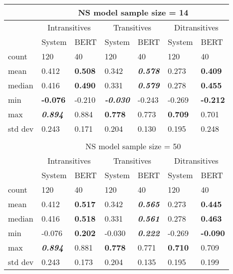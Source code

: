 \begin{table}[htb!]
\begin{center}
\begin{tabular}{|l||l|l||l|l||l|l|}
\hline
 & \multicolumn{6}{c|}{NS model sample size = 14} \\
\hline
 & \multicolumn{2}{c||}{Intransitives} & \multicolumn{2}{c||}{Transitives} & \multicolumn{2}{c|}{Ditransitives} \\
\hline
		& System 	& BERT 		& System 	& BERT 		& System 	& BERT 		\\
\hline
\hline
count 	& 120 		& 40 		& 120 		& 40 		& 120 		& 40		 \\
\hline
mean 	& 0.412 	& \textbf{0.508} 	& 0.342 	& \textit{\textbf{0.578}}		& 0.273 	& \textbf{0.409}	 \\
\hline
median 	& 0.416 	& \textbf{0.490} 	& 0.331 	& \textit{\textbf{0.579}}		& 0.278 	& \textbf{0.455}	 \\
\hline
min 	& \textbf{-0.076} 	& -0.210 	& \textit{\textbf{-0.030}} 	& -0.243	& -0.269 	& \textbf{-0.212}	 \\
\hline
max 	& \textit{\textbf{0.894}} 	& 0.884		& \textbf{0.778} 	& 0.773		& \textbf{0.709} 	& 0.701	 \\
\hline
std dev & 0.243 	& 0.171		& 0.204 	& 0.130		& 0.195 	& 0.248	 \\
\hline
\multicolumn{7}{c}{} \\
\hline
 & \multicolumn{6}{c|}{NS model sample size = 50} \\
\hline
 & \multicolumn{2}{c||}{Intransitives} & \multicolumn{2}{c||}{Transitives} & \multicolumn{2}{c|}{Ditransitives} \\
\hline
		& System 	& BERT 				& System 	& BERT 						& System 	& BERT \\
\hline
\hline
count 	& 120 		& 40 				& 120 		& 40 						& 120 		& 40 	\\
\hline
mean 	& 0.412 	& \textbf{0.517} 	& 0.342 	& \textit{\textbf{0.565}}	& 0.273 	& \textbf{0.445} \\
\hline
median 	& 0.416 	& \textbf{0.518}	& 0.331 	& \textit{\textbf{0.561}}	& 0.278 	& \textbf{0.463} \\
\hline
min 	& -0.076 	& \textbf{0.202}	& -0.030 	& \textit{\textbf{0.222}}	 & -0.269 	& \textbf{-0.090} \\
\hline
max & \textit{\textbf{0.894}} & 0.881	& \textbf{0.778} & 0.771	 			& \textbf{0.710} 	& 0.709 \\
\hline
std dev & 0.243 	& 0.173 			& 0.204 	& 0.135 					& 0.195 	& 0.199 \\

\end{tabular}
\end{center}
\end{table}
